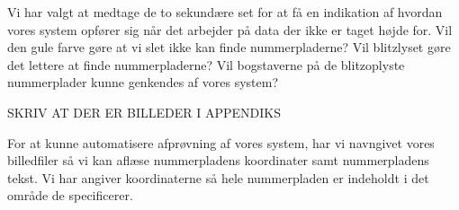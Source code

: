 Vi har valgt at medtage de to sekundære set for at få en indikation af hvordan vores system opfører sig når det arbejder på data der ikke er taget højde for. Vil den gule farve gøre at vi slet ikke kan finde nummerpladerne? Vil blitzlyset gøre det lettere at finde nummerpladerne? Vil bogstaverne på de blitzoplyste nummerplader kunne genkendes af vores system?

SKRIV AT DER ER BILLEDER I APPENDIKS

For at kunne automatisere afprøvning af vores system, har vi navngivet vores billedfiler så vi kan aflæse nummerpladens koordinater samt nummerpladens tekst. Vi har angiver koordinaterne så hele nummerpladen er indeholdt i det område de specificerer.